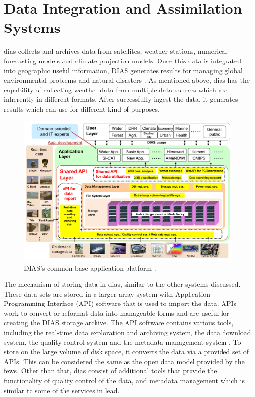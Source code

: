 \section{Data Integration and Assimilation Systems}
\label{se:dias}

\acrfull{dias} collects and archives data from satellites, weather stations, numerical forecasting models and climate projection models. Once this data is integrated into geographic useful information, DIAS generates results for managing global environmental problems and natural disasters \cite{Kawasaki2018DataReduction}. As mentioned above, \acrshort{dias} has the capability of collecting weather data from multiple data sources which are inherently in different formats. After successfully ingest the data, it generates results which can use for different kind of purposes.

\begin{figure}[htp]
    \centering
    \includegraphics[width=1\textwidth]{lit/other/dias_common_base_application_platform.jpg}
    \caption[DIAS’s common base application platform.]{DIAS’s common base application platform \cite{Kawasaki2018DataReduction}.}
    \label{fi:dias_common_platform}
\end{figure}

The mechanism of storing data in \acrshort{dias}, similar to the other systems discussed.
These data sets are stored in a larger array system with Application Programming Interface (API) software that is used to import the data. APIs work to convert or reformat data into manageable forms and are useful for creating the DIAS storage archive. The API software contains various tools, including the real-time data exploration and archiving system, the data download system, the quality control system and the metadata management system \cite{Kawasaki2018DataReduction}. To store on the large volume of disk space, it converts the data via a provided set of APIs. This can be considered the same as the open data model provided by the \acrshort{fews}. Other than that, \acrshort{dias} consist of additional tools that provide the functionality of quality control of the data, and metadata management which is similar to some of the services in \acrshort{lead}.

